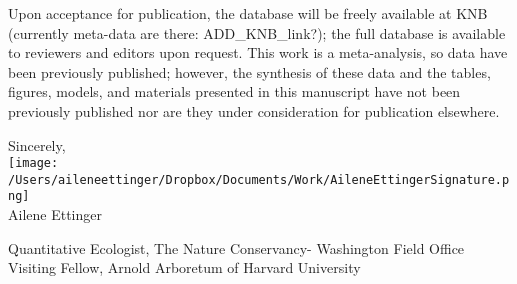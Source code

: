 \documentclass[11.5pt,a4paper]{letter}
\begin{document}
\begin{letter}{}
\par Upon acceptance for publication, the database will be freely available at KNB (currently meta-data are there: ADD_KNB_link?); the full database is available to reviewers and editors upon request. This work is a meta-analysis, so data have been previously published; however, the synthesis of these data and the tables, figures, models, and materials presented in this manuscript have not been previously published nor are they under consideration for publication elsewhere.


Sincerely,\\

\texttt{[image: /Users/aileneettinger/Dropbox/Documents/Work/AileneEttingerSignature.png]} \\
Ailene Ettinger\\
\begin{footnotesize}
Quantitative Ecologist, The Nature Conservancy- Washington Field Office
Visiting Fellow, Arnold Arboretum of Harvard University 
\end{footnotesize}

\end{letter}
\end{document}
